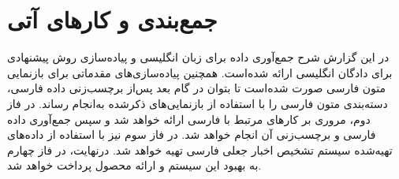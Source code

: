 \chapter{جمع‌بندی و کارهای آتی}
در این گزارش شرح جمع‌آوری داده برای زبان انگلیسی و پیاده‌سازی روش پیشنهادی برای دادگان انگلیسی ارائه شده‌است. همچنین پیاده‌سازی‌های مقدماتی برای بازنمایی متون فارسی صورت شده‌است تا بتوان در گام بعد پس‌از برچسب‌زنی داده فارسی، دسته‌بندی متون فارسی را با استفاده از بازنمایی‌های ذکرشده به‌انجام رساند. در فاز دوم، مروری بر کارهای مرتبط با فارسی ارائه خواهد شد و سپس جمع‌آوری داده فارسی و برچسب‌زنی آن انجام خواهد شد. در فاز سوم نیز با استفاده از داده‌های تهیه‌شده سیستم تشخیص اخبار جعلی فارسی تهیه خواهد شد. درنهایت، در فاز چهارم به بهبود این سیستم و ارائه محصول پرداخت خواهد شد.